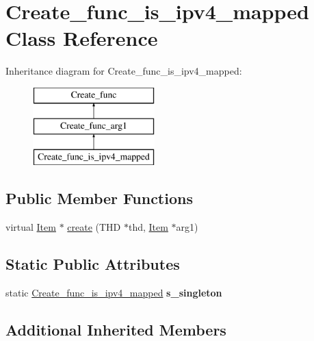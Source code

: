 \hypertarget{classCreate__func__is__ipv4__mapped}{}\section{Create\+\_\+func\+\_\+is\+\_\+ipv4\+\_\+mapped Class Reference}
\label{classCreate__func__is__ipv4__mapped}
Inheritance diagram for Create\+\_\+func\+\_\+is\+\_\+ipv4\+\_\+mapped\+:\begin{figure}[H]
\begin{center}
\leavevmode
\includegraphics[height=3.000000cm]{classCreate__func__is__ipv4__mapped}
\end{center}
\end{figure}
\subsection*{Public Member Functions}
\begin{DoxyCompactItemize}
\item 
virtual \mbox{\hyperlink{classItem}{Item}} $\ast$ \mbox{\hyperlink{classCreate__func__is__ipv4__mapped_a404f5bfae1d75555eaf30b5e74600da1}{create}} (T\+HD $\ast$thd, \mbox{\hyperlink{classItem}{Item}} $\ast$arg1)
\end{DoxyCompactItemize}
\subsection*{Static Public Attributes}
\begin{DoxyCompactItemize}
\item 
\mbox{\label{classCreate__func__is__ipv4__mapped_a2c3a5a3a7c60a839448c3bd252fabb99}} 
static \mbox{\hyperlink{classCreate__func__is__ipv4__mapped}{Create\+\_\+func\+\_\+is\+\_\+ipv4\+\_\+mapped}} {\bfseries s\+\_\+singleton}
\end{DoxyCompactItemize}
\subsection*{Additional Inherited Members}


